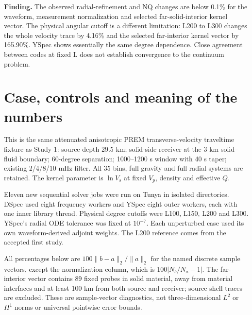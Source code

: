 \documentclass[11pt,a4paper]{article}
\begin{document}
\textbf{Finding.} The observed radial-refinement and NQ changes are below 0.1\% for the waveform, measurement normalization and selected far-solid-interior kernel vector. The physical angular cutoff is a different limitation: L200 to L300 changes the whole velocity trace by 4.16\% and the selected far-interior kernel vector by 165.90\%. YSpec shows essentially the same degree dependence. Close agreement between codes at fixed L does not establish convergence to the continuum problem.

\section{Case, controls and meaning of the numbers}
This is the same attenuated anisotropic PREM transverse-velocity traveltime fixture as Study 1: source depth 29.5 km; solid-side receiver at the 3 km solid--fluid boundary; 60-degree separation; 1000--1200 s window with 40 s taper; existing 2/4/8/10 mHz filter. All 35 bins, full gravity and full radial systems are retained. The kernel parameter is $\ln V_s$ at fixed $V_p$, density and effective $Q$.

Eleven new sequential solver jobs were run on Tunya in isolated directories. DSpec used eight frequency workers and YSpec eight outer workers, each with one inner library thread. Physical degree cutoffs were L100, L150, L200 and L300. YSpec's radial ODE tolerance was fixed at $10^{-7}$. Each unperturbed case used its own waveform-derived adjoint weights. The L200 reference comes from the accepted first study.

All percentages below are $100\|b-a\|_2/\|a\|_2$ for the named discrete sample vectors, except the normalization column, which is $100|N_b/N_a-1|$. The far-interior vector contains 89 fixed probes in solid material, away from material interfaces and at least 100 km from both source and receiver; source-shell traces are excluded. These are sample-vector diagnostics, not three-dimensional $L^2$ or $H^1$ norms or universal pointwise error bounds.
\end{document}
